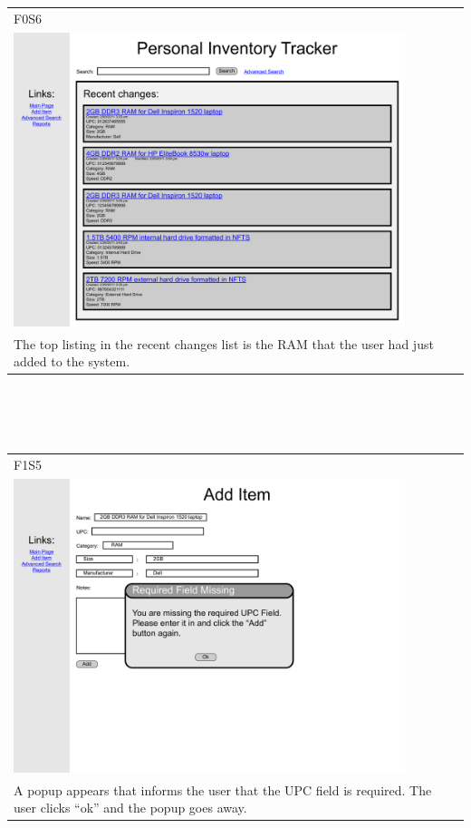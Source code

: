\documentclass{article}
\begin{document}
~\\
~\\
\begin{tabular}{ p{4.5in} }
F0S6\\
\includegraphics[keepaspectratio, width=4.5in]{addItemF0S6.pdf} \\
The top listing in the recent changes list is the RAM that the user had just added to the system.
\end{tabular}\\
~\\
~\\
\begin{tabular}{ p{4.5in} }
F1S5\\
\includegraphics[keepaspectratio, width=4.5in]{addItemF1S5.pdf} \\
A popup appears that informs the user that the UPC field is required. The user clicks ``ok'' and the popup goes away.
\end{tabular}\\
\end{document}
